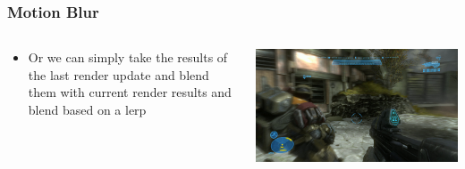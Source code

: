 \begin{frame}
	\frametitle{Motion Blur}
	\begin{columns}
		\begin{column}{0.5\textwidth}
			\begin{itemize}
				\item Or we can simply take the results of the last render update and blend them with current render results and blend based on a lerp
			\end{itemize}
		\end{column}
		\begin{column}{0.5\textwidth} 
			\begin{center}
				\includegraphics[width=\textwidth]{motion_blur}
			\end{center}
		\end{column}
	\end{columns}
\end{frame}

